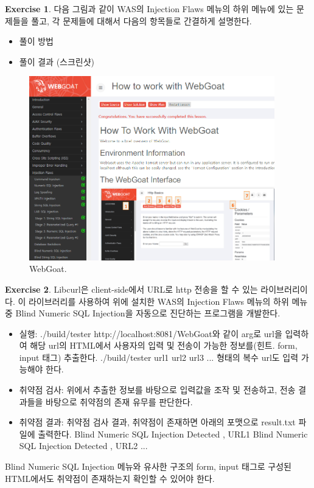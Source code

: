 \documentclass[a4paper, 11pt]{article}
\theoremstyle{definition}
\newtheorem{exercise}{Exercise}
\begin{document}
\begin{exercise}

다음 그림과 같이 WAS의 Injection Flaws 메뉴의 하위 메뉴에 있는 문제들을 풀고, 각 문제들에 대해서 다음의 항목들로 간결하게 설명한다. 

\begin{itemize}
  \item 풀이 방법
  \item 풀이 결과 (스크린샷)
\end{itemize}

\begin{figure}[h]
  \includegraphics[height=8cm]{webgoat.png}
  \caption{WebGoat.}
  \label{fig:webgoat}
\end{figure}

\end{exercise}

\begin{exercise}

Libcurl\cite{libcurl}은 client-side에서 URL로 http 전송을 할 수 있는 라이브러리이다. 이 라이브러리를 사용하여 위에 설치한 WAS의 Injection Flaws 메뉴의 하위 메뉴 중 Blind Numeric SQL Injection을 자동으로 진단하는 프로그램을 개발한다. 

\begin{itemize}
  \item 실행: ./build/tester http://localhost:8081/WebGoat와 같이 arg로 url을 입력하여 해당 url의 HTML에서 사용자의 입력 및 전송이 가능한 정보를(힌트. form, input 태그) 추출한다. \cite{href} ./build/tester url1  url2  url3 ... 형태의 복수 url도 입력 가능해야 한다.  
  \item 취약점 검사: 위에서 추출한 정보를 바탕으로 입력값을 조작 및 전송하고,\cite{post} 전송 결과들을 바탕으로 취약점의 존재 유무를 판단한다. \cite{getinfo}
  \item 취약점 결과: 취약점 검사 결과, 취약점이 존재하면 아래의 포맷으로 result.txt 파일에 출력한다. \newline  
  Blind Numeric SQL Injection Detected , URL1 \newline 
  Blind Numeric SQL Injection Detected , URL2 \newline
                     ...  
\end{itemize}

Blind Numeric SQL Injection 메뉴와 유사한 구조의 form, input 태그로 구성된 HTML에서도 취약점이 존재하는지 확인할 수 있어야 한다. 

\end{exercise}
\end{document}
